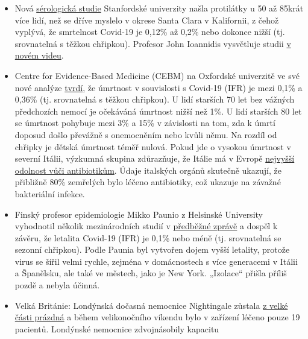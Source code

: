 \begin{itemize}
\tightlist
\item
  Nová
  \href{https://www.medrxiv.org/content/10.1101/2020.04.14.20062463v1}{sérologická
  studie} Stanfordské univerzity našla protilátky u 50 až 85krát více
  lidí, než se dříve myslelo v okrese Santa Clara v Kalifornii, z čehož
  vyplývá, že smrtelnost Covid-19 je 0,12\% až 0,2\% nebo dokonce nižší
  (tj. srovnatelná s těžkou chřipkou). Profesor John Ioannidis
  vysvětluje studii \href{https://www.youtube.com/watch?v=jGUgrEfSgaU}{v
  novém videu}.
\item
  Centre for Evidence-Based Medicine (CEBM) na Oxfordské univerzitě ve
  své nové analýze
  \href{https://www.cebm.net/covid-19/global-covid-19-case-fatality-rates/}{tvrdí},
  že úmrtnost v souvislosti s Covid-19 (IFR) je mezi 0,1\% a 0,36\% (tj.
  srovnatelná s těžkou chřipkou). U lidí starších 70 let bez vážných
  předchozích nemocí je očekáváná úmrtnost nižší než 1\%. U lidí
  starších 80 let se úmrtnost pohybuje mezi 3\% a 15\% v závislosti na
  tom, zda k úmrtí doposud došlo převážně s onemocněním nebo kvůli němu.
  Na rozdíl od chřipky je dětská úmrtnost téměř nulová. Pokud jde o
  vysokou úmrtnost v severní Itálii, výzkumná skupina zdůrazňuje, že
  Itálie má v Evropě
  \href{https://www.ansa.it/english/news/science_tecnology/2019/11/19/italy-top-in-eu-in-antibiotic-resistance_369e0123-0107-445e-8c17-f11932c9d27c.html}{nejvyšší
  odolnost vůči antibiotikům}. Údaje italských orgánů skutečně ukazují,
  že přibližně 80\% zemřelých bylo léčeno antibiotiky, což ukazuje na
  závažné bakteriální infekce.
\item
  Finský profesor epidemiologie Mikko Paunio z Helsinské University
  vyhodnotil několik mezinárodních studií v
  \href{https://lockdownsceptics.org/wp-content/uploads/2020/04/How-the-World-got-Fooled-by-COVID-ed-2c.pdf}{předběžné
  zprávě} a dospěl k závěru, že letalita Covid-19 (IFR) je 0,1\% nebo
  méně (tj. srovnatelná se sezonní chřipkou). Podle Paunia byl vytvořen
  dojem vyšší letality, protože virus se šířil velmi rychle, zejména v
  domácnostech s více generacemi v Itálii a Španělsku, ale také ve
  městech, jako je New York. „Izolace`` přišla příliš pozdě a nebyla
  účinná.
\item
  Velká Británie: Londýnská dočasná nemocnice Nightingale zůstala
  \href{https://www.hsj.co.uk/service-design/exclusive-nightingale-largely-empty-as-icus-handle-surge/7027398.article}{z
  velké části prázdná} a během velikonočního víkendu bylo v zařízení
  léčeno pouze 19 pacientů. Londýnské nemocnice zdvojnásobily kapacitu

\end{itemize}
